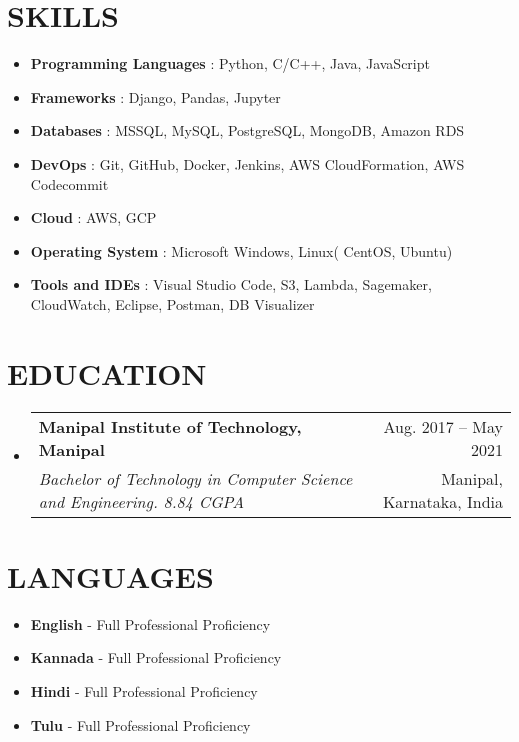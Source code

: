 \documentclass[letterpaper,11pt]{article}
\makeatletter
\newcommand{\resumeItem}[1]{
  \item\small{
    {#1 \vspace{-1pt}}
  }
}
\newcommand{\resumeSubheading}[4]{
  \vspace{-1pt}\item
    \begin{tabular*}{\textwidth}[t]{l@{\extracolsep{\fill}}r}
      \textbf{#1} & {\color{dark-grey}\small #2}\vspace{1pt}\\ %
      \textit{#3} & {\color{dark-grey} \small #4}\\ %
    \end{tabular*}\vspace{-4pt}
}
\newcommand{\resumeSubHeadingListStart}{\begin{itemize}[leftmargin=0in, label={}]}
\newcommand{\resumeSubHeadingListEnd}{\end{itemize}}
\newcommand{\resumeItemListStart}{\begin{itemize}}
\newcommand{\resumeItemListEnd}{\end{itemize}\vspace{0pt}}
\makeatother
\begin{document}
\section{SKILLS}
 \begin{itemize}
    \item \textbf{Programming Languages} {: Python, C/C++, Java, JavaScript}\vspace{2pt} \\
    \item \textbf{Frameworks} {: Django, Pandas, Jupyter}\vspace{2pt} \\
    \item \textbf{Databases} {: MSSQL, MySQL, PostgreSQL, MongoDB, Amazon RDS}\vspace{2pt} \\
    \item \textbf{DevOps} {: Git, GitHub, Docker, Jenkins, AWS CloudFormation, AWS Codecommit}\vspace{2pt} \\
    \item \textbf{Cloud}     {: AWS, GCP}\vspace{2pt} \\
    \item \textbf{Operating System} {: Microsoft Windows, Linux( CentOS, Ubuntu)}\vspace{2pt} \\
    \item \textbf{Tools and IDEs} {: Visual Studio Code, S3, Lambda, Sagemaker, CloudWatch, Eclipse, Postman, DB Visualizer}\vspace{2pt} \\
 \end{itemize}
 


\section {EDUCATION}
  \resumeSubHeadingListStart
    \resumeSubheading
      {Manipal Institute of Technology, Manipal}{Aug. 2017 -- May 2021}
      {Bachelor of Technology in Computer Science and Engineering. 8.84 CGPA}{Manipal, Karnataka, India}
  \resumeSubHeadingListEnd

\section {LANGUAGES}
  \resumeItemListStart
    \resumeItem{\textbf{English } - Full Professional Proficiency}
    \resumeItem{\textbf{Kannada } - Full Professional Proficiency}
    \resumeItem{\textbf{Hindi } - Full Professional Proficiency}
    \resumeItem{\textbf{Tulu } - Full Professional Proficiency}
  \resumeItemListEnd
\end{document}
